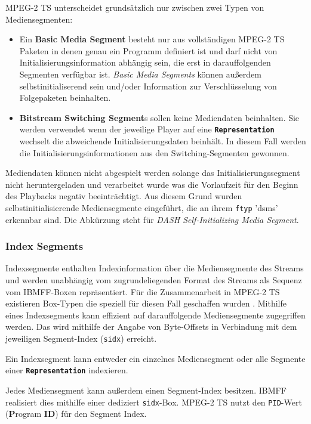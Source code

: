 \documentclass[paper = a4, fontsize = 12pt, parskip = half]{scrartcl} %
\def\attr#1{\texttt{#1}}
\def\elem#1{\texttt{\textbf{#1}}}
\begin{document}
MPEG-2 TS unterscheidet grundsätzlich nur zwischen zwei Typen von Mediensegmenten:
\begin{itemize}
	\item Ein \textbf{Basic Media Segment} besteht nur aus vollständigen MPEG-2 TS Paketen in denen genau ein Programm definiert ist und darf nicht von Initialisierungsinformation abhängig sein, die erst in darauffolgenden Segmenten verfügbar ist. \textit{Basic Media Segments} können außerdem selbstinitialiserend sein und/oder Information zur Verschlüsselung von Folgepaketen beinhalten.
	\item \textbf{Bitstream Switching Segment}s sollen keine Mediendaten beinhalten. Sie werden verwendet wenn der jeweilige Player auf eine \elem{Representation} wechselt die abweichende Initialisierungsdaten beinhält. In diesem Fall werden die Initialisierungsinformationen aus den Switching-Segmenten gewonnen.
\end{itemize}

Mediendaten können nicht abgespielt werden solange das Initialisierungssegment nicht heruntergeladen und verarbeitet wurde was die Vorlaufzeit für den Beginn des Playbacks negativ beeinträchtigt. Aus diesem Grund wurden selbstinitialisierende Mediensegmente eingeführt, die an ihrem \attr{ftyp} 'dsms' erkennbar sind. Die Abkürzung steht für \textit{DASH Self-Initializing Media Segment}.

\subsubsection{Index Segments}
Indexsegmente enthalten Indexinformation über die Mediensegmente des Streams und werden unabhängig vom zugrundeliegenden Format des Streams als Sequenz vom IBMFF-Boxen repräsentiert. Für die Zusammenarbeit in MPEG-2 TS existieren Box-Typen die speziell für diesen Fall geschaffen wurden \cite{international_organization_for_standardization_isoiec_nodate}.
Mithilfe eines Indexsegments kann effizient auf darauffolgende Mediensegmente zugegriffen werden. Das wird mithilfe der Angabe von Byte-Offsets in Verbindung mit dem jeweiligen Segment-Index (\attr{sidx}) erreicht.

Ein Indexsegment kann entweder ein einzelnes Mediensegment oder alle Segmente einer \elem{Representation} indexieren.

Jedes Mediensegment kann außerdem einen Segment-Index besitzen. IBMFF realisiert dies mithilfe einer dediziert \attr{sidx}-Box. MPEG-2 TS nutzt den \attr{PID}-Wert (\textbf{P}rogram \textbf{ID}) für den Segment Index. 
\end{document}
